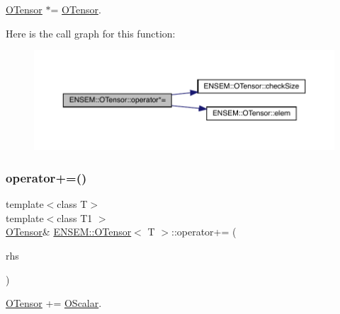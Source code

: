 \mbox{\hyperlink{classENSEM_1_1OTensor}{O\+Tensor}} $\ast$= \mbox{\hyperlink{classENSEM_1_1OTensor}{O\+Tensor}}. 

Here is the call graph for this function\+:
\nopagebreak
\begin{figure}[H]
\begin{center}
\leavevmode
\includegraphics[width=350pt]{da/d8a/classENSEM_1_1OTensor_a6edba72b265fa3629417ad85c9ae1477_cgraph}
\end{center}
\end{figure}
\mbox{\label{classENSEM_1_1OTensor_a93fe0d4638104ad0f6bdaf5de7760276}} 
\subsubsection{\texorpdfstring{operator+=()}{operator+=()}\hspace{0.1cm}{\footnotesize\ttfamily [1/4]}}
{\footnotesize\ttfamily template$<$class T$>$ \\
template$<$class T1 $>$ \\
\mbox{\hyperlink{classENSEM_1_1OTensor}{O\+Tensor}}\& \mbox{\hyperlink{classENSEM_1_1OTensor}{E\+N\+S\+E\+M\+::\+O\+Tensor}}$<$ T $>$\+::operator+= (\begin{DoxyParamCaption}\item[{const \mbox{\hyperlink{classENSEM_1_1OScalar}{O\+Scalar}}$<$ T1 $>$ \&}]{rhs }\end{DoxyParamCaption})\hspace{0.3cm}{\ttfamily [inline]}}



\mbox{\hyperlink{classENSEM_1_1OTensor}{O\+Tensor}} += \mbox{\hyperlink{classENSEM_1_1OScalar}{O\+Scalar}}. 

